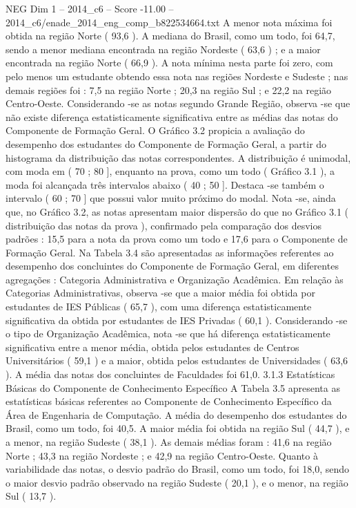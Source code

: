 \begin{textsample}{NEG Dim 1 – 2014\_c6 – Score -11.00 – 2014\_c6/enade\_2014\_eng\_comp\_b822534664.txt}
A menor nota máxima foi obtida na região Norte ( 93,6 ).
A mediana do Brasil, como um todo, foi 64,7, sendo a menor mediana encontrada na região Nordeste ( 63,6 ) ; e a maior encontrada na região Norte ( 66,9 ).
A nota mínima nesta parte foi zero, com pelo menos um estudante obtendo essa nota nas regiões Nordeste e Sudeste ; nas demais regiões foi : 7,5 na região Norte ; 20,3 na região Sul ; e 22,2 na região Centro-Oeste.
Considerando -se as notas segundo Grande Região, observa -se que não existe diferença estatisticamente significativa entre as médias das notas do Componente de Formação Geral.
O Gráfico 3.2 propicia a avaliação do desempenho dos estudantes do Componente de Formação Geral, a partir do histograma da distribuição das notas correspondentes.
A distribuição é unimodal, com moda em ( 70 ; 80 ], enquanto na prova, como um todo ( Gráfico 3.1 ), a moda foi alcançada três intervalos abaixo ( 40 ; 50 ].
Destaca -se também o intervalo ( 60 ; 70 ] que possui valor muito próximo do modal.
Nota -se, ainda que, no Gráfico 3.2, as notas apresentam maior dispersão do que no Gráfico 3.1 ( distribuição das notas da prova ), confirmado pela comparação dos desvios padrões : 15,5 para a nota da prova como um todo e 17,6 para o Componente de Formação Geral.
Na Tabela 3.4 são apresentadas as informações referentes ao desempenho dos concluintes do Componente de Formação Geral, em diferentes agregações : Categoria Administrativa e Organização Acadêmica.
Em relação às Categorias Administrativas, observa -se que a maior média foi obtida por estudantes de IES Públicas ( 65,7 ), com uma diferença estatisticamente significativa da obtida por estudantes de IES Privadas ( 60,1 ).
Considerando -se o tipo de Organização Acadêmica, nota -se que há diferença estatisticamente significativa entre a menor média, obtida pelos estudantes de Centros Universitários ( 59,1 ) e a maior, obtida pelos estudantes de Universidades ( 63,6 ).
A média das notas dos concluintes de Faculdades foi 61,0. 3.1.3 Estatísticas Básicas do Componente de Conhecimento Específico A Tabela 3.5 apresenta as estatísticas básicas referentes ao Componente de Conhecimento Específico da Área de Engenharia de Computação.
A média do desempenho dos estudantes do Brasil, como um todo, foi 40,5.
A maior média foi obtida na região Sul ( 44,7 ), e a menor, na região Sudeste ( 38,1 ).
As demais médias foram : 41,6 na região Norte ; 43,3 na região Nordeste ; e 42,9 na região Centro-Oeste.
Quanto à variabilidade das notas, o desvio padrão do Brasil, como um todo, foi 18,0, sendo o maior desvio padrão observado na região Sudeste ( 20,1 ), e o menor, na região Sul ( 13,7 ).

\end{textsample}
